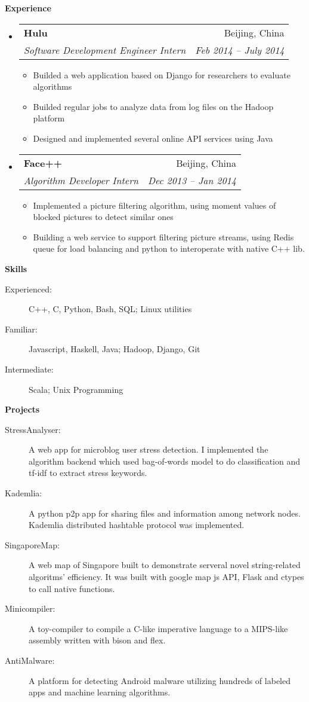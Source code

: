 \documentclass[letterpaper,11pt]{article}
\makeatletter
\newcommand{\resitem}[1]{\item #1 \vspace{-2pt}}
\newcommand{\resheading}[1]{{\large \colorbox{mygrey}{\begin{minipage}{\textwidth}{\textbf{#1 \vphantom{p\^{E}}}}\end{minipage}}}}
\newcommand{\ressubheading}[4]{
\begin{tabular*}{6.5in}{l@{\extracolsep{\fill}}r}
        \textbf{#1} & #2 \\
        \textit{#3} & \textit{#4} \\
\end{tabular*}\vspace{-6pt}}
\makeatother
\begin{document}
\resheading{Experience}
    \begin{itemize}
        \item 
            \ressubheading{Hulu}{Beijing, China}
                {Software Development Engineer Intern}{Feb 2014 -- July 2014}
                { \footnotesize
                \begin{itemize}
						\resitem{Builded a web application based on Django for researchers to evaluate algorithms}
                        \resitem{Builded regular jobs to analyze data from log files on the Hadoop platform}
                        \resitem{Designed and implemented several online API services using Java}
                \end{itemize}
                }
        \item 
            \ressubheading{Face++}{Beijing, China}{Algorithm Developer Intern}{Dec 2013 -- Jan 2014}
                { \footnotesize
                \begin{itemize}
                        \resitem{Implemented a picture filtering algorithm, using moment values of blocked pictures to detect similar ones}
                        \resitem{Building a web service to support filtering picture streams, using Redis queue for load balancing and python to interoperate with native C++ lib.}
                \end{itemize}
                }
    \end{itemize}  %

\resheading{Skills}
    \begin{description}
    \item[Experienced:] { \footnotesize C++, C, Python, Bash, SQL; Linux utilities}
    \item[Familiar:] { \footnotesize Javascript, Haskell, Java; Hadoop, Django, Git}
    \item[Intermediate:] { \footnotesize Scala; Unix Programming}
    \end{description} %
\resheading{Projects}
    \begin{description}
	\item[StressAnalyser:]{\footnotesize A web app for microblog user stress detection. I implemented the algorithm backend which used bag-of-words model to do classification and tf-idf to extract stress keywords.}  
	\item[Kademlia:]{\footnotesize A python p2p app for sharing files and information among network nodes. Kademlia distributed hashtable protocol was implemented.}
    \item[SingaporeMap:]{\footnotesize A web map of Singapore built to demonstrate serveral novel string-related algoritms' efficiency. It was built with google map js API, Flask and ctypes to call native functions.}
    \item[Minicompiler:]{\footnotesize A toy-compiler to compile a C-like imperative language to a MIPS-like assembly written with bison and flex. }
	\item[AntiMalware:] {\footnotesize A platform for detecting Android malware utilizing hundreds of labeled apps and machine learning algorithms. }
    \end{description}
\end{document}
